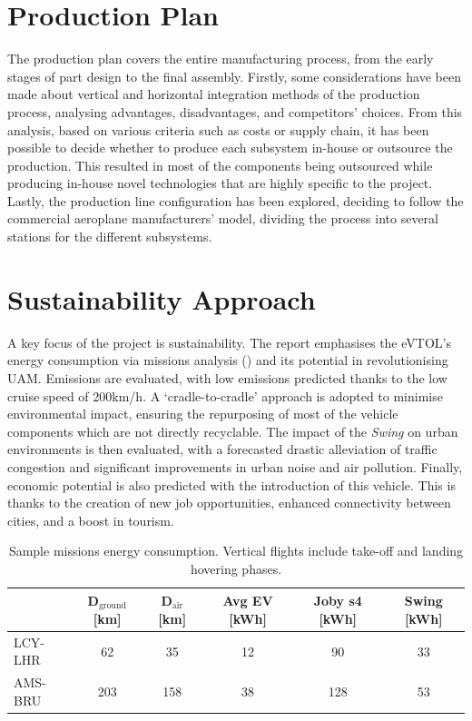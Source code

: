 


\section*{Production Plan}
The production plan covers the entire manufacturing process, from the early stages of part design to the final assembly. Firstly, some considerations have been made about vertical and horizontal integration methods of the production process, analysing advantages, disadvantages, and competitors' choices. From this analysis, based on various criteria such as costs or supply chain, it has been possible to decide whether to produce each subsystem in-house or outsource the production. This resulted in most of the components being outsourced while producing in-house novel technologies that are highly specific to the project. Lastly, the production line configuration has been explored, deciding to follow the commercial aeroplane manufacturers’ model, dividing the process into several stations for the different subsystems.

\section*{Sustainability Approach}
A key focus of the project is sustainability.
The report emphasises the eVTOL's energy consumption via missions analysis () and its potential in revolutionising UAM. Emissions are evaluated, with low emissions predicted thanks to the low cruise speed of 200km/h.
A \enquote*{cradle-to-cradle} approach is adopted to minimise environmental impact, ensuring the repurposing of most of the vehicle components which are not directly recyclable. The impact of the \textit{Swing} on urban environments is then evaluated, with a forecasted drastic alleviation of traffic congestion and significant improvements in urban noise and air pollution. Finally, economic potential is also predicted with the introduction of this vehicle. This is thanks to the creation of new job opportunities, enhanced connectivity between cities, and a boost in tourism.


\begin{table}[H]
\caption{Sample missions energy consumption. Vertical flights include take-off and landing hovering phases.}
\centering
\begin{tabular}{l|c|c|c|c|c}
\textbf{} & \textbf{D$_\text{ground}$[km]}  & \textbf{D$_\text{air}$ [km]}  & \textbf{Avg EV [kWh]}  & \textbf{Joby s4 [kWh]} & \textbf{Swing [kWh]}  \\ \toprule
LCY-LHR & 62  & 35  & 12 & 90 & 33    \\
AMS-BRU  & 203 & 158 & 38 & 128 & 53   \\ \bottomrule
\end{tabular}
\label{tab:energymissionsexe}
\end{table}

